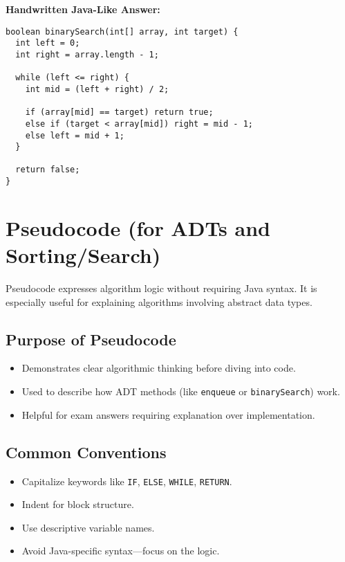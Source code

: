 \documentclass[11pt]{article}
\begin{document}
\vspace{1em}
\textbf{Handwritten Java-Like Answer:}
\begin{verbatim}
boolean binarySearch(int[] array, int target) {
  int left = 0;
  int right = array.length - 1;

  while (left <= right) {
    int mid = (left + right) / 2;

    if (array[mid] == target) return true;
    else if (target < array[mid]) right = mid - 1;
    else left = mid + 1;
  }

  return false;
}
\end{verbatim}


\hrulefill

\section*{Pseudocode (for ADTs and Sorting/Search)}

Pseudocode expresses algorithm logic without requiring Java syntax. It is especially useful for explaining algorithms involving abstract data types.

\subsection*{Purpose of Pseudocode}
\begin{itemize}
  \item Demonstrates clear algorithmic thinking before diving into code.
  \item Used to describe how ADT methods (like \texttt{enqueue} or \texttt{binarySearch}) work.
  \item Helpful for exam answers requiring explanation over implementation.
\end{itemize}

\subsection*{Common Conventions}
\begin{itemize}
  \item Capitalize keywords like \texttt{IF}, \texttt{ELSE}, \texttt{WHILE}, \texttt{RETURN}.
  \item Indent for block structure.
  \item Use descriptive variable names.
  \item Avoid Java-specific syntax—focus on the logic.
\end{itemize}
\end{document}
